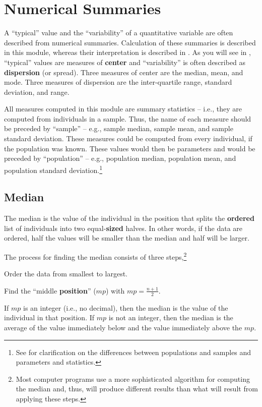\documentclass[10pt,openany]{book}\usepackage[]{graphicx}\usepackage[]{color}
\begin{document}
\section{Numerical Summaries} \label{sec:quEDACenter}
A ``typical'' value and the ``variability'' of a quantitative variable are often described from numerical summaries. Calculation of these summaries is described in this module, whereas their interpretation is described in . As you will see in , ``typical'' values are measures of \textbf{center} and ``variability'' is often described as \textbf{dispersion} (or spread). Three measures of center are the median, mean, and mode. Three measures of dispersion are the inter-quartile range, standard deviation, and range.

All measures computed in this module are summary statistics -- i.e., they are computed from individuals in a sample. Thus, the name of each measure should be preceded by ``sample'' -- e.g., sample median, sample mean, and sample standard deviation. These measures could be computed from every individual, if the population was known. These values would then be parameters and would be preceded by ``population'' -- e.g., population median, population mean, and population standard deviation.\footnote{See  for clarification on the differences between populations and samples and parameters and statistics.}


\subsection{Median} \label{sec:Median}
The median is the value of the individual in the position that splits the \textbf{ordered} list of individuals into two equal-\textbf{sized} halves. In other words, if the data are ordered, half the values will be smaller than the median and half will be larger.

The process for finding the median consists of three steps,\footnote{Most computer programs use a more sophisticated algorithm for computing the median and, thus, will produce different results than what will result from applying these steps.}
\vspace{-8pt}
\begin{Enumerate}
  \item Order the data from smallest to largest.
  \item Find the ``middle \textbf{position}'' ($mp$) with $mp=\frac{n+1}{2}$.
  \item If $mp$ is an integer (i.e., no decimal), then the median is the value of the individual in that position. If $mp$ is not an integer, then the median is the average of the value immediately below and the value immediately above the $mp$.
\end{Enumerate}
\end{document}
